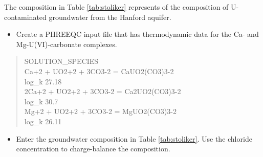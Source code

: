 The composition in Table \ref{tab:stoliker}
represents of the composition of U-contaminated groundwater from the Hanford aquifer.  

\begin{itemize}
\item Create a PHREEQC input file that has thermodynamic data for the Ca- and Mg-U(VI)-carbonate complexes.
\end{itemize}

\begin{quote}
{\color{red}SOLUTION\_SPECIES \\
Ca+2 +  UO2+2  +  3CO3-2  =  CaUO2(CO3)3-2 \\
log\_k	27.18 \\
2Ca+2 +  UO2+2  +  3CO3-2  =  Ca2UO2(CO3)3-2 \\
log\_k	30.7 \\
Mg+2 +  UO2+2  +  3CO3-2  =  MgUO2(CO3)3-2 \\
log\_k	26.11 }\\
\end{quote}

\begin{itemize}
\item Enter the groundwater composition in Table \ref{tab:stoliker}. Use the chloride concentration to charge-balance the composition.
\end{itemize}

